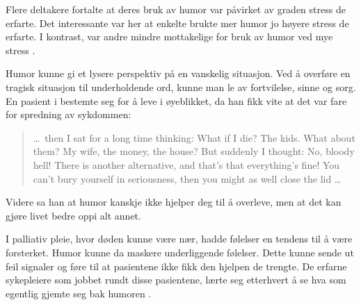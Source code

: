 Flere deltakere fortalte at deres bruk av humor var påvirket av graden stress
de erfarte. Det interessante var her at enkelte brukte mer humor jo høyere
stress de erfarte. I kontrast, var andre mindre mottakelige for bruk av humor
ved mye stress \cite{dean2005}.

Humor kunne gi et lysere perspektiv på en vanskelig situasjon. Ved å overføre
en tragisk situasjon til underholdende ord, kunne man le av fortvilelse, sinne
og sorg. En pasient i  bestemte seg for å leve i
øyeblikket, da han fikk vite at det var fare for spredning av sykdommen:
\blockquote[{}]{\ldots\ then I sat for a long time
thinking: What if I die? The kids. What about them? My wife, the money, the
house? But suddenly I thought: No, bloody hell!  There is another alternative,
and that's that everything's fine! You can't bury yourself in seriousness, then
you might as well close the lid \ldots}.

Videre sa han at humor kanskje ikke hjelper deg til å overleve, men at det kan
gjøre livet bedre oppi alt annet.

I palliativ pleie, hvor døden kunne være nær, hadde følelser en tendens til å
være forsterket. Humor kunne da maskere underliggende følelser. Dette kunne
sende ut feil signaler og føre til at pasientene ikke fikk den hjelpen de
trengte. De erfarne sykepleiere som jobbet rundt disse pasientene, lærte seg
etterhvert å se hva som egentlig gjemte seg bak humoren \cite{mccreaddie2011}.
